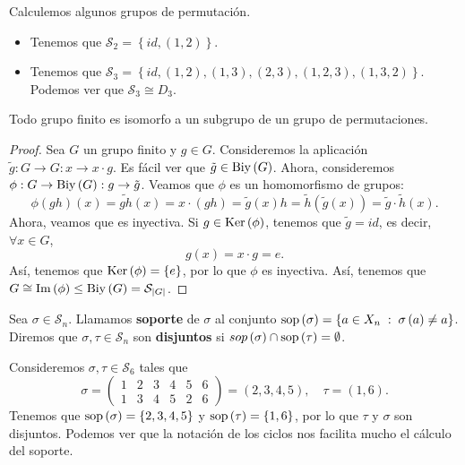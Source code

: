 \begin{eg} Calculemos algunos grupos de permutación.
	\begin{itemize}
	\item Tenemos que $\displaystyle \mathcal{S}_{2} = \left\{ id, \left(1,2\right)\right\}  $.
	\item Tenemos que $\displaystyle \mathcal{S}_{3}= \left\{ id, \left(1,2\right), \left(1,3\right), \left(2,3\right), \left(1,2,3\right), \left(1,3,2\right)\right\}  $. Podemos ver que $\displaystyle \mathcal{S}_{3} \cong D_{3} $.
	\end{itemize}	 
\end{eg}
\begin{theorem}
Todo grupo finito es isomorfo a un subgrupo de un grupo de permutaciones.
\end{theorem}
\begin{proof}
	Sea $\displaystyle G $ un grupo finito y $\displaystyle g \in G $. Consideremos la aplicación $\displaystyle \tilde{g} : G \to G : x \to x \cdot g $. Es fácil ver que $\displaystyle \tilde{g} \in \operatorname{Biy}\left(G\right) $. Ahora, consideremos $\displaystyle \phi : G \to \operatorname{Biy}\left(G\right) : g \to \tilde{g} $. Veamos que $\displaystyle \phi $ es un homomorfismo de grupos:
	\[\phi\left(gh\right)\left(x\right) = \widetilde{gh}\left(x\right) = x \cdot \left(gh\right) = \tilde{g}\left(x\right)h = \tilde{h}\left(\tilde{g}\left(x\right)\right) = \tilde{g} \cdot \tilde{h}\left(x\right) .\]
	Ahora, veamos que es inyectiva. Si $\displaystyle g \in \operatorname{Ker}\left(\phi\right) $, tenemos que $\displaystyle \tilde{g} = id $, es decir, $\displaystyle \forall x \in G $, 
	\[g\left(x\right) = x \cdot g = e .\]
	Así, tenemos que $\displaystyle \operatorname{Ker}\left(\phi\right) = \left\{ e\right\}  $, por lo que $\displaystyle \phi $ es inyectiva. Así, tenemos que $\displaystyle G \cong \operatorname{Im}\left(\phi\right) \leq \operatorname{Biy}\left(G\right) = \mathcal{S}_{ \left|G\right|}$. 	
\end{proof}
\begin{definition}[Soporte]
	Sea $\displaystyle \sigma \in \mathcal{S}_{n} $. Llamamos \textbf{soporte} de $\displaystyle \sigma  $ al conjunto $\displaystyle \operatorname{sop}\left(\sigma \right) = \left\{ a \in X_{n} \; : \; \sigma\left(a\right) \neq a\right\}  $. Diremos que $\displaystyle \sigma, \tau \in \mathcal{S}_{n} $ son \textbf{disjuntos} si $\displaystyle sop\left(\sigma \right) \cap \operatorname{sop}\left(\tau\right) = \emptyset $. 
\end{definition}
\begin{eg}
Consideremos $\displaystyle \sigma, \tau \in \mathcal{S}_{6} $ tales que
\[\sigma = \begin{pmatrix} 1 & 2 & 3 & 4 & 5 & 6 \\ 1 & 3 & 4 & 5 & 2 & 6 \end{pmatrix} = \left(2,3,4,5\right), \quad \tau = \left(1,6\right) .\]
Tenemos que $\displaystyle \operatorname{sop}\left(\sigma \right)= \left\{ 2,3,4,5\right\}  $ y $\displaystyle \operatorname{sop}\left(\tau\right) = \left\{ 1,6\right\}  $, por lo que $\displaystyle \tau $ y $\displaystyle \sigma  $ son disjuntos. Podemos ver que la notación de los ciclos nos facilita mucho el cálculo del soporte.
\end{eg}
